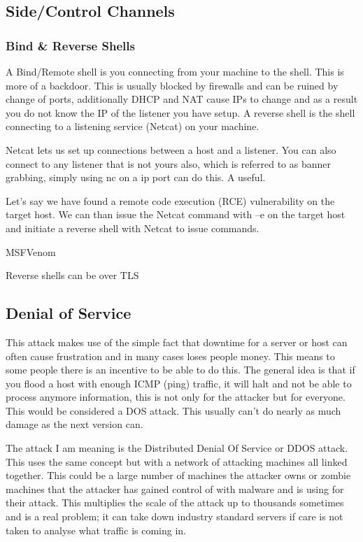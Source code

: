 \subsection{Side/Control Channels}
\subsubsection{Bind & Reverse Shells}
A Bind/Remote shell is you connecting from your machine to the shell. This is more of a backdoor. This is usually blocked by firewalls and can be ruined by change of ports, additionally DHCP and NAT cause IPs to change and as a result you do not know the IP of the listener you have setup.
A reverse shell is the shell connecting to a listening service (Netcat) on your machine.

Netcat lets us set up connections between a host and a listener. You can also connect to any listener that is not yours also, which is referred to as banner grabbing, simply using nc on a ip port can do this. 
A useful. 

Let’s say we have found a remote code execution (RCE) vulnerability on the target host. We can than issue the Netcat command with –e on the target host and initiate a reverse shell with Netcat to issue commands.

MSFVenom

Reverse shells can be over TLS



\subsection{Denial of Service}
This attack makes use of the simple fact that downtime for a server or host can often cause frustration and in many cases loses people money. This means to some people there is an incentive to be able to do this. The general idea is that if you flood a host with enough ICMP (ping) traffic, it will halt and not be able to process anymore information, this is not only for the attacker but for everyone. This would be considered a DOS attack. 
This usually can't do nearly as much damage as the next version can. 

The attack I am meaning is the Distributed Denial Of Service or DDOS attack. This uses the same concept but with a network of attacking machines all linked together. This could be a large number of machines the attacker owns or zombie machines that the attacker has gained control of with malware and is using for their attack. This multiplies the scale of the attack up to thousands sometimes and is a real problem; it can take down industry 
standard servers if care is not taken to analyse what traffic is coming in.

